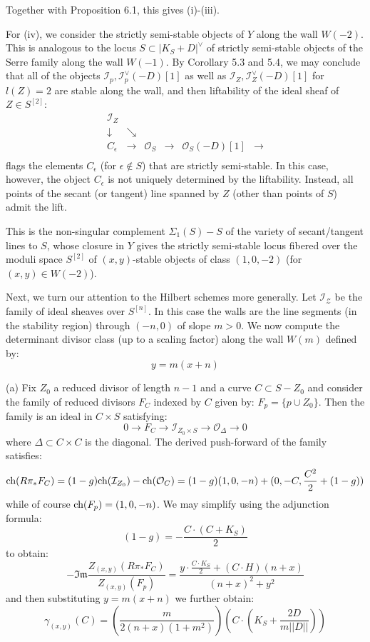 \documentclass{amsart}
\begin{document}
\medskip

Together with Proposition 6.1, this gives (i)-(iii). 

\medskip

For (iv), we consider the strictly semi-stable 
objects of $Y$ along the wall $W(-2)$. This is analogous to the locus $S \subset |K_S + D|^\vee$ of strictly semi-stable 
objects of the Serre family along the wall $W(-1)$. By Corollary 5.3 and 5.4, we may conclude that all of the objects ${\mathcal I}_p, {\mathcal I}_p^\vee(-D)[1]$ as well as 
${\mathcal I}_Z, {\mathcal I}_Z^\vee(-D)[1]$ for $l(Z) = 2$ are stable along the wall, and then liftability of the ideal sheaf of $Z \in S^{[2]}$: 
\[ \begin{array}{cccccccccc} 
 {\mathcal I}_Z \\  \downarrow & \searrow \\ C_\epsilon & \rightarrow & {\mathcal O}_S & \rightarrow & {\mathcal O}_S(-D)[1] & \rightarrow \\
 \end{array} \] 
flags the elements $C_\epsilon$ (for $\epsilon \not \in S$) that are strictly semi-stable. In this case, however, the object $C_\epsilon$ is not uniquely 
determined by the liftability. Instead, all points of the secant (or tangent) line spanned by $Z$ (other than points of $S$) admit the lift. 

\medskip

This is the non-singular complement $\Sigma_1(S) - S$ of the variety of 
secant/tangent lines to $S$, whose closure in $Y$ gives the strictly semi-stable locus fibered over the moduli space $S^{[2]}$ 
of $(x,y)$-stable objects of class $(1,0,-2)$ (for $(x,y) \in W(-2)$).

\medskip

Next, we turn our attention to the Hilbert schemes more generally. 
Let ${\mathcal I}_{\mathcal Z}$ be the family of ideal sheaves over $S^{[n]}$. In this case the walls are the line segments (in the stability region) through
$(-n,0)$ of slope $m > 0$. We now compute the determinant divisor class (up to a scaling factor) along the wall $W(m)$ defined by: 
\[ y = m(x + n) \] 

(a) Fix $Z_0$ a reduced divisor of length $n-1$ and a curve $C \subset S - Z_0$ and consider the family of reduced divisors $F_C$ indexed by $C$ given by: 
$F_p = \{ p \cup Z_0 \}$.  
Then the family is an ideal in $C \times S$ satisfying: 
\[ 0 \rightarrow F_C \rightarrow {\mathcal I}_{Z_0 \times S} \rightarrow {\mathcal O}_\Delta \rightarrow 0 \] 
where $\Delta \subset C \times C$ is the diagonal. The derived push-forward of the family satisfies: 
\[ \mbox{ch}(R\pi_* F_C) = (1 - g)\mbox{ch}({\mathcal I}_{Z_0}) - \mbox{ch}({\mathcal O}_C) = (1-g)(1, 0, -n) + (0,-C, \frac {C^2}2 + (1-g)) \]
while of course
$\mbox{ch}(F_p) = (1,0,-n)$.  
We may simplify using the adjunction formula:
\[ (1 - g) = - \frac{C \cdot (C + K_S)}2 \] 
to obtain: 
\[ - \mathfrak{Im} \frac{Z_{(x,y)}(R\pi_* F_C)}{Z_{(x,y)}(F_p)} = \frac {y \cdot \frac{C \cdot K_S}2 + (C\cdot H)(n+x)}{(n + x)^2 + y^2}\] 
and then substituting $y = m(x + n)$ we further obtain:
\[ \gamma_{(x,y)}(C) = \left(\frac{m}{2(n+x)(1 + m^2)}\right)  \left( C \cdot (K_S + \frac {2D}{m||D||})\right)  \] 
\end{document}
